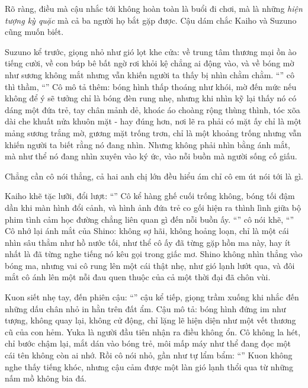 \documentclass[../main.tex]{subfiles}
\begin{document}
Rõ ràng, điều mà cậu nhắc tới không hoàn toàn là buổi đi chơi, mà là những \emph{hiện tượng kỳ quặc} mà cả ba người họ bắt gặp được. Cậu dám chắc Kaiho và Suzuno cũng muốn biết.

Suzuno kể trước, giọng nhỏ như gió lọt khe cửa: về trung tâm thương mại ồn ào tiếng cười, về con búp bê bất ngờ rơi khỏi kệ chẳng ai động vào, và về bóng mờ như sương không mắt nhưng vẫn khiến người ta thấy bị nhìn chằm chằm. ``'' cô thì thầm, ``'' Cô mô tả thêm: bóng hình thấp thoáng như khói, mờ đến mức nếu không để ý sẽ tưởng chỉ là bóng đèn rung nhẹ, nhưng khi nhìn kỹ lại thấy nó có dáng một đứa trẻ, tay chân mảnh dẻ, khoác áo choàng rộng thùng thình, tóc xõa dài che khuất nửa khuôn mặt - hay đúng hơn, nơi lẽ ra phải có mặt ấy chỉ là một mảng sương trắng mờ, gương mặt trống trơn, chỉ là một khoảng trống nhưng vẫn khiến người ta biết rằng nó đang nhìn. Nhưng không phải nhìn bằng ánh mắt, mà như thể nó đang nhìn xuyên vào ký ức, vào nỗi buồn mà người sống cố giấu.

Chẳng cần cô nói thẳng, cả hai anh chị lớn đều hiểu ám chỉ cô em út nói tới là gì.

Kaiho khẽ tặc lưỡi, đổi lượt: ``'' Cô kể hàng ghế cuối trống không, bóng tối đậm dần khi màn hình đổi cảnh, và hình ảnh đứa trẻ co gối hiện ra thình lình giữa bộ phim tình cảm học đường chẳng liên quan gì đến nỗi buồn ấy. ``'' cô nói khẽ, ``'' Cô nhớ lại ánh mắt của Shino: không sợ hãi, không hoảng loạn, chỉ là một cái nhìn sâu thẳm như hồ nước tối, như thể cô ấy đã từng gặp hồn ma này, hay ít nhất là đã từng nghe tiếng nó kêu gọi trong giấc mơ. Shino không nhìn thẳng vào bóng ma, nhưng vai cô rung lên một cái thật nhẹ, như gió lạnh lướt qua, và đôi mắt cô ánh lên một nỗi đau quen thuộc của cả một thời đại đã chôn vùi.

Kuon siết nhẹ tay, đến phiên cậu: ``'' cậu kể tiếp, giọng trầm xuống khi nhắc đến những dấu chân nhỏ in hằn trên đất ẩm. Cậu mô tả: bóng hình đứng im như tượng, không quay lại, không cử động, chỉ lặng lẽ hiện diện như một vết thương cũ của con hẻm. Yuka là người đầu tiên nhận ra điều không ổn. Cô không la hét, chỉ bước chậm lại, mắt dán vào bóng trẻ, môi mấp máy như thể đang đọc một cái tên không còn ai nhớ. Rồi cô nói nhỏ, gần như tự lẩm bẩm: ``'' Kuon không nghe thấy tiếng khóc, nhưng cậu cảm được một làn gió lạnh thổi qua từ những nấm mồ không bia đá.
\end{document}
